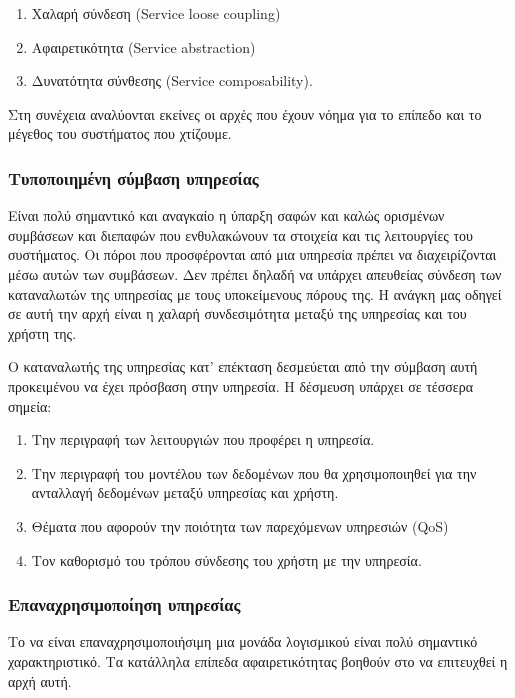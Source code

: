 \begin{enumerate}
\item Χαλαρή σύνδεση (Service loose coupling)
\item Αφαιρετικότητα (Service abstraction)
\item Δυνατότητα σύνθεσης (Service composability).
\setcounter{numberedCntJ}{\theenumi}
\end{enumerate}
Στη συνέχεια αναλύονται εκείνες οι αρχές που έχουν νόημα για το επίπεδο 
και το μέγεθος του συστήματος που χτίζουμε.

\subsubsection{Τυποποιημένη σύμβαση υπηρεσίας}

Είναι πολύ σημαντικό και αναγκαίο η ύπαρξη σαφών και καλώς 
ορισμένων συμβάσεων και διεπαφών που ενθυλακώνουν τα στοιχεία και τις 
λειτουργίες του συστήματος. Οι πόροι που προσφέρονται από μια υπηρεσία 
πρέπει να διαχειρίζονται μέσω αυτών των συμβάσεων. Δεν πρέπει δηλαδή να 
υπάρχει απευθείας σύνδεση των καταναλωτών της υπηρεσίας με τους 
υποκείμενους πόρους της. Η ανάγκη μας οδηγεί σε αυτή την αρχή είναι η 
χαλαρή συνδεσιμότητα μεταξύ της υπηρεσίας και του χρήστη της. 

Ο καταναλωτής της υπηρεσίας κατ' επέκταση δεσμεύεται από την σύμβαση 
αυτή προκειμένου να έχει πρόσβαση στην υπηρεσία. Η δέσμευση υπάρχει σε 
τέσσερα σημεία:

\begin{enumerate}
\item Την περιγραφή των λειτουργιών που προφέρει η υπηρεσία.
\item Την περιγραφή του μοντέλου των δεδομένων που θα χρησιμοποιηθεί για 
την ανταλλαγή δεδομένων μεταξύ υπηρεσίας και χρήστη.
\item Θέματα που αφορούν την ποιότητα των παρεχόμενων υπηρεσιών (QoS)
\item Τον καθορισμό του τρόπου σύνδεσης του χρήστη με την υπηρεσία.
\setcounter{numberedCntBA}{\theenumi}
\end{enumerate}

\subsubsection{Επαναχρησιμοποίηση υπηρεσίας}

Το να είναι επαναχρησιμοποιήσιμη μια μονάδα λογισμικού είναι 
πολύ σημαντικό χαρακτηριστικό. Τα κατάλληλα επίπεδα αφαιρετικότητας 
βοηθούν στο να επιτευχθεί η αρχή αυτή.

